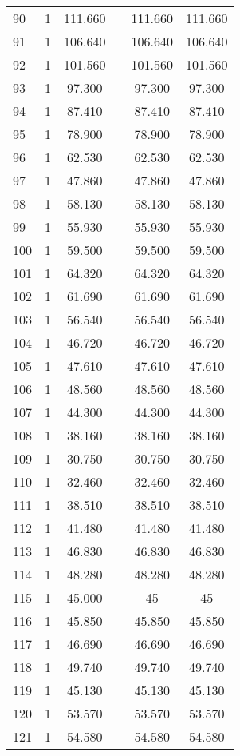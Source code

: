 \begin{table}[!htbp]
\begin{tabular}{@{\extracolsep{5pt}}lccccc}
90 & 1 & 111.660 &  & 111.660 & 111.660 \\ 
91 & 1 & 106.640 &  & 106.640 & 106.640 \\ 
92 & 1 & 101.560 &  & 101.560 & 101.560 \\ 
93 & 1 & 97.300 &  & 97.300 & 97.300 \\ 
94 & 1 & 87.410 &  & 87.410 & 87.410 \\ 
95 & 1 & 78.900 &  & 78.900 & 78.900 \\ 
96 & 1 & 62.530 &  & 62.530 & 62.530 \\ 
97 & 1 & 47.860 &  & 47.860 & 47.860 \\ 
98 & 1 & 58.130 &  & 58.130 & 58.130 \\ 
99 & 1 & 55.930 &  & 55.930 & 55.930 \\ 
100 & 1 & 59.500 &  & 59.500 & 59.500 \\ 
101 & 1 & 64.320 &  & 64.320 & 64.320 \\ 
102 & 1 & 61.690 &  & 61.690 & 61.690 \\ 
103 & 1 & 56.540 &  & 56.540 & 56.540 \\ 
104 & 1 & 46.720 &  & 46.720 & 46.720 \\ 
105 & 1 & 47.610 &  & 47.610 & 47.610 \\ 
106 & 1 & 48.560 &  & 48.560 & 48.560 \\ 
107 & 1 & 44.300 &  & 44.300 & 44.300 \\ 
108 & 1 & 38.160 &  & 38.160 & 38.160 \\ 
109 & 1 & 30.750 &  & 30.750 & 30.750 \\ 
110 & 1 & 32.460 &  & 32.460 & 32.460 \\ 
111 & 1 & 38.510 &  & 38.510 & 38.510 \\ 
112 & 1 & 41.480 &  & 41.480 & 41.480 \\ 
113 & 1 & 46.830 &  & 46.830 & 46.830 \\ 
114 & 1 & 48.280 &  & 48.280 & 48.280 \\ 
115 & 1 & 45.000 &  & 45 & 45 \\ 
116 & 1 & 45.850 &  & 45.850 & 45.850 \\ 
117 & 1 & 46.690 &  & 46.690 & 46.690 \\ 
118 & 1 & 49.740 &  & 49.740 & 49.740 \\ 
119 & 1 & 45.130 &  & 45.130 & 45.130 \\ 
120 & 1 & 53.570 &  & 53.570 & 53.570 \\ 
121 & 1 & 54.580 &  & 54.580 & 54.580 \\ 

\end{tabular}
\end{table}
